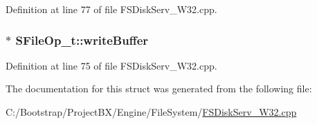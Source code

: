 Definition at line 77 of file FSDiskServ\_\-W32.cpp.\hypertarget{struct_s_file_op__t_35a76a584a5395b66dc709e5a81a690a}{
\subsubsection[{writeBuffer}]{$\ast$ {\bf SFileOp\_\-t::writeBuffer}}}
\label{struct_s_file_op__t_35a76a584a5395b66dc709e5a81a690a}




Definition at line 75 of file FSDiskServ\_\-W32.cpp.

The documentation for this struct was generated from the following file:\begin{CompactItemize}
\item 
C:/Bootstrap/ProjectBX/Engine/FileSystem/\hyperlink{_f_s_disk_serv___w32_8cpp}{FSDiskServ\_\-W32.cpp}\end{CompactItemize}

